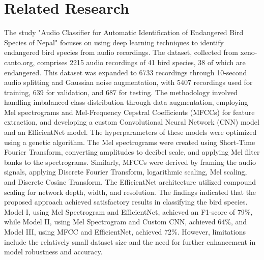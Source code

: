 \section{Related Research}

The study\cite{gautam2023audio} "Audio Classifier for Automatic Identification
of Endangered Bird Species of Nepal" focuses on using deep learning techniques
to identify endangered bird species from audio recordings. The dataset,
collected from xeno-canto.org, comprises 2215 audio recordings of 41 bird
species, 38 of which are endangered. This dataset was expanded to 6733
recordings through 10-second audio splitting and Gaussian noise augmentation,
with 5407 recordings used for training, 639 for validation, and 687 for
testing. The methodology involved handling imbalanced class distribution
through data augmentation, employing Mel spectrograms and Mel-Frequency
Cepstral Coefficients (MFCCs) for feature extraction, and developing a custom
Convolutional Neural Network (CNN) model and an EfficientNet model. The
hyperparameters of these models were optimized using a genetic algorithm. The
Mel spectrograms were created using Short-Time Fourier Transform, converting
amplitudes to decibel scale, and applying Mel filter banks to the spectrograms.
Similarly, MFCCs were derived by framing the audio signals, applying Discrete
Fourier Transform, logarithmic scaling, Mel scaling, and Discrete Cosine
Transform. The EfficientNet architecture utilized compound scaling for network
depth, width, and resolution. The findings indicated that the proposed approach
achieved satisfactory results in classifying the bird species. Model I, using
Mel Spectrogram and EfficientNet, achieved an F1-score of 79\%, while Model II,
using Mel Spectrogram and Custom CNN, achieved 64\%, and Model III, using MFCC
and EfficientNet, achieved 72\%. However, limitations include the relatively
small dataset size and the need for further enhancement in model robustness and
accuracy.

